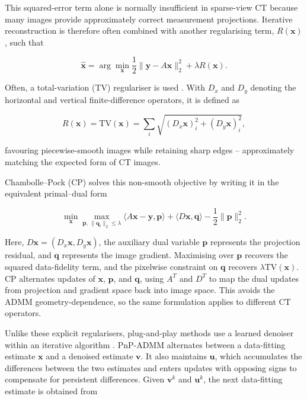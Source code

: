 This squared-error term alone is normally insufficient in sparse-view CT because many images provide approximately correct measurement projections. Iterative reconstruction is therefore often combined with another regularising term, $R(\mathbf{x})$, such that

\begin{equation}
\hat{\mathbf{x}}
=
\arg\min_{\mathbf{x}}
\frac{1}{2}
\|\mathbf{y}-A\mathbf{x}\|_2^2
+
\lambda R(\mathbf{x}).
\label{eq:regularised_reconstruction_objective}
\end{equation}

Often, a total-variation (TV) regulariser is used \cite{rudin_nonlinear_1992}. With $D_x$ and $D_y$ denoting the horizontal and vertical finite-difference operators, it is defined as

\begin{equation}
R(\mathbf{x})=\mathrm{TV}(\mathbf{x})
=
\sum_i
\sqrt{
(D_x\mathbf{x})_i^2
+
(D_y\mathbf{x})_i^2
},
\label{eq:total_variation_regulariser}
\end{equation}

favouring piecewise-smooth images while retaining sharp edges -- approximately matching the expected form of CT images.

Chambolle--Pock (CP) solves this non-smooth objective by writing it in the equivalent primal--dual form \cite{chambolle_first-order_2011}

\begin{equation}
\min_{\mathbf{x}}\max_{\mathbf{p},\,\|\mathbf{q}_i\|_2\leq\lambda}
\langle A\mathbf{x}-\mathbf{y},\mathbf{p}\rangle
+\langle D\mathbf{x},\mathbf{q}\rangle
-\frac{1}{2}\|\mathbf{p}\|_2^2.
\label{eq:chambolle_pock_saddle}
\end{equation}

Here, $D\mathbf{x}=(D_x\mathbf{x},D_y\mathbf{x})$, the auxiliary dual variable $\mathbf{p}$ represents the projection residual, and $\mathbf{q}$ represents the image gradient. Maximising over $\mathbf{p}$ recovers the squared data-fidelity term, and the pixelwise constraint on $\mathbf{q}$ recovers $\lambda\mathrm{TV}(\mathbf{x})$. CP alternates updates of $\mathbf{x}$, $\mathbf{p}$, and $\mathbf{q}$, using $A^T$ and $D^T$ to map the dual updates from projection and gradient space back into image space. This avoids the ADMM geometry-dependence, so the same formulation applies to different CT operators.

Unlike these explicit regularisers, plug-and-play methods use a learned denoiser within an iterative algorithm \cite{chan_plug-and-play_2017}. PnP-ADMM alternates between a data-fitting estimate $\mathbf{x}$ and a denoised estimate $\mathbf{v}$. It also maintains $\mathbf{u}$, which accumulates the differences between the two estimates and enters updates with opposing signs to compensate for persistent differences. Given $\mathbf{v}^k$ and $\mathbf{u}^k$, the next data-fitting estimate is obtained from

